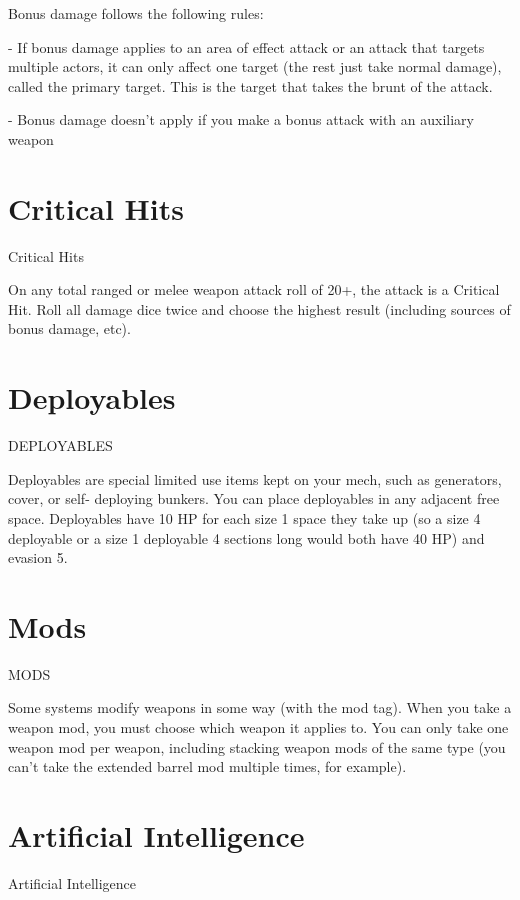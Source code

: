                                                                                                                 


Bonus damage follows the following rules:
 
         	- If bonus damage applies to an area of effect attack or an attack that targets multiple  
         actors, it can only affect one target (the rest just take normal damage), called the primary  
         target. This is the target that takes the brunt of the attack.
 
         	- Bonus damage doesn’t apply if you make a bonus attack with an auxiliary weapon  
\section{Critical Hits}
                                                Critical Hits  

On any total ranged or melee weapon attack roll of 20+, the attack is a Critical Hit. Roll all  
damage dice twice and choose the highest result (including sources of bonus damage, etc).  
\section{Deployables}
                                             DEPLOYABLES  

Deployables are special limited use items kept on your mech, such as generators, cover, or self- 
deploying bunkers. You can place deployables in any adjacent free space. Deployables have 10  
HP for each size 1 space they take up (so a size 4 deployable or a size 1 deployable 4 sections  
long would both have 40 HP) and evasion 5.  
\section{Mods}
                                                    MODS  

Some systems modify weapons in some way (with the mod tag). When you take a weapon mod,  
you must choose which weapon it applies to. You can only take one weapon mod per weapon,  
including stacking weapon mods of the same type (you can’t take the extended barrel mod  
multiple times, for example).  
\section{Artificial Intelligence}
                                        Artificial Intelligence  

